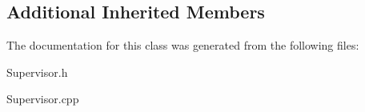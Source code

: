 \subsection*{Additional Inherited Members}


The documentation for this class was generated from the following files\+:\begin{DoxyCompactItemize}
\item 
Supervisor.\+h\item 
Supervisor.\+cpp\end{DoxyCompactItemize}
